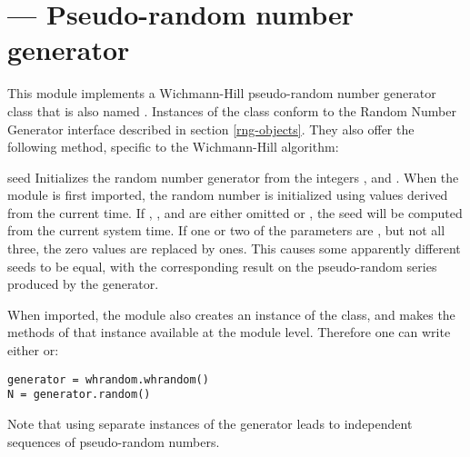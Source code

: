 \section{ ---
         Pseudo-random number generator}



This module implements a Wichmann-Hill pseudo-random number generator
class that is also named .  Instances of the
 class conform to the Random Number Generator
interface described in section \ref{rng-objects}.  They also offer the 
following method, specific to the Wichmann-Hill algorithm:

\begin{methoddesc}[whrandom]{seed}{}
  Initializes the random number generator from the integers ,
   and .  When the module is first imported, the random
  number is initialized using values derived from the current time.
  If , , and  are either omitted or , the 
  seed will be computed from the current system time.  If one or two
  of the parameters are , but not all three, the zero values
  are replaced by ones.  This causes some apparently different seeds
  to be equal, with the corresponding result on the pseudo-random
  series produced by the generator.
\end{methoddesc}


When imported, the  module also creates an instance of
the  class, and makes the methods of that instance
available at the module level.  Therefore one can write either 
 or:

\begin{verbatim}
generator = whrandom.whrandom()
N = generator.random()
\end{verbatim}

Note that using separate instances of the generator leads to
independent sequences of pseudo-random numbers.

\begin{seealso}
\end{seealso}

